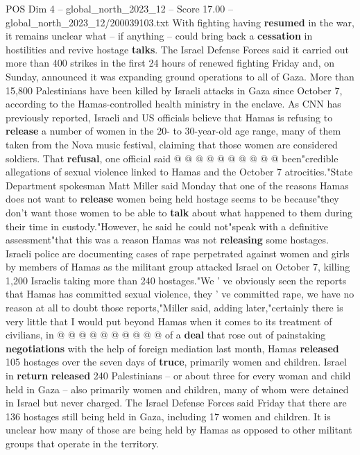 \begin{textsample}{POS Dim 4 – global\_north\_2023\_12 – Score 17.00 – global\_north\_2023\_12/200039103.txt}
With fighting having \textbf{resumed} in the war, it remains unclear what -- if anything -- could bring back a \textbf{cessation} in hostilities and revive hostage \textbf{talks}.
The Israel Defense Forces said it carried out more than 400 strikes in the first 24 hours of renewed fighting Friday and, on Sunday, announced it was expanding ground operations to all of Gaza.
More than 15,800 Palestinians have been killed by Israeli attacks in Gaza since October 7, according to the Hamas-controlled health ministry in the enclave.
As CNN has previously reported, Israeli and US officials believe that Hamas is refusing to \textbf{release} a number of women in the 20- to 30-year-old age range, many of them taken from the Nova music festival, claiming that those women are considered soldiers.
That \textbf{refusal}, one official said @ @ @ @ @ @ @ @ @ @ been"credible allegations of sexual violence linked to Hamas and the October 7 atrocities."State Department spokesman Matt Miller said Monday that one of the reasons Hamas does not want to \textbf{release} women being held hostage seems to be because"they don't want those women to be able to \textbf{talk} about what happened to them during their time in custody."However, he said he could not"speak with a definitive assessment"that this was a reason Hamas was not \textbf{releasing} some hostages.
Israeli police are documenting cases of rape perpetrated against women and girls by members of Hamas as the militant group attacked Israel on October 7, killing 1,200 Israelis taking more than 240 hostages."We ' ve obviously seen the reports that Hamas has committed sexual violence, they ' ve committed rape, we have no reason at all to doubt those reports,"Miller said, adding later,"certainly there is very little that I would put beyond Hamas when it comes to its treatment of civilians, in @ @ @ @ @ @ @ @ @ @ of a \textbf{deal} that rose out of painstaking \textbf{negotiations} with the help of foreign mediation last month, Hamas \textbf{released} 105 hostages over the seven days of \textbf{truce}, primarily women and children.
Israel in \textbf{return} \textbf{released} 240 Palestinians -- or about three for every woman and child held in Gaza -- also primarily women and children, many of whom were detained in Israel but never charged.
The Israel Defense Forces said Friday that there are 136 hostages still being held in Gaza, including 17 women and children.
It is unclear how many of those are being held by Hamas as opposed to other militant groups that operate in the territory.

\end{textsample}
